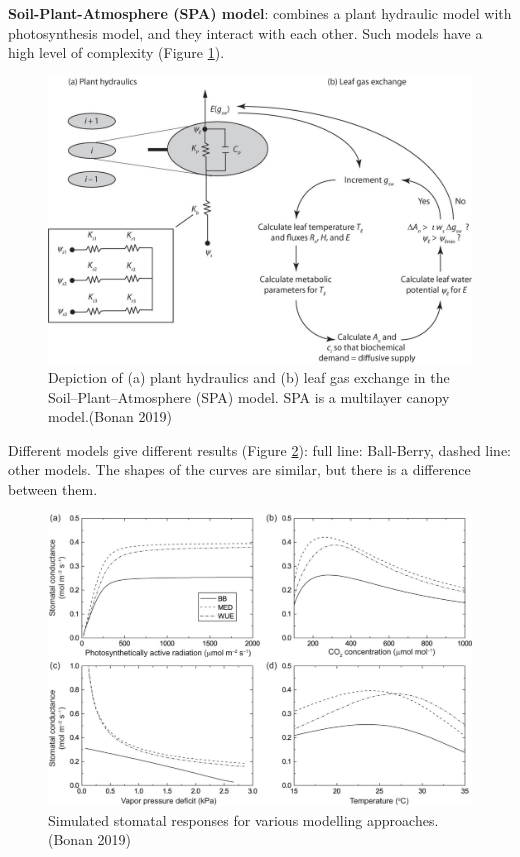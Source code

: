 \documentclass[
  12pt,
  oneside]{book}
\begin{document}
\textbf{Soil-Plant-Atmosphere (SPA) model}: combines a plant hydraulic model with photosynthesis model, and they interact with each other. Such models have a high level of complexity (Figure \ref{fig:f219}).

\begin{figure}

{\centering \includegraphics[width=0.8\linewidth]{figures/chap2/SPA} 

}

\caption{Depiction of (a) plant hydraulics and (b) leaf gas exchange in the Soil–Plant–Atmosphere (SPA) model. SPA is a multilayer canopy model.(Bonan 2019)}\label{fig:f219}
\end{figure}

Different models give different results (Figure \ref{fig:f220}): full line: Ball-Berry, dashed line: other models. The shapes of the curves are similar, but there is a difference between them.

\begin{figure}

{\centering \includegraphics[width=0.8\linewidth]{figures/chap2/modelling_approaches} 

}

\caption{Simulated stomatal responses for various modelling approaches. (Bonan 2019)}\label{fig:f220}
\end{figure}
\end{document}
